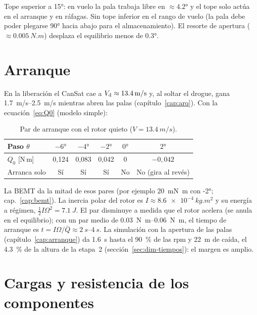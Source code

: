 \begin{resultado}
Tope superior a \ang{+15}: en vuelo la pala trabaja libre en $\approx\ang{4.2}$ y el tope
solo actúa en el arranque y en ráfagas. Sin tope inferior en el rango de vuelo (la pala
debe poder plegarse \ang{90} hacia abajo para el almacenamiento). El resorte de apertura
($\approx\SI{0.005}{N.m}$) desplaza el equilibrio menos de \ang{0.3}.
\end{resultado}

\section{Arranque}\label{sec:arranque}
En la liberación el CanSat cae a $V_{\mathrm{d}}\approx\SI{13.4}{m/s}$ y, al soltar el drogue, gana
\SIrange{1.7}{2.5}{m/s} mientras abren las palas (capítulo~\ref{cap:arq}). Con la
ecuación~\eqref{eq:Q0} (modelo simple):

\begin{table}[H]
\centering\small
\caption{Par de arranque con el rotor quieto ($V=\SI{13.4}{m/s}$).}\label{tab:arranque}
\begin{tabular}{@{}lccccc@{}}
\toprule
Paso $\theta$ & $\ang{-6}$ & $\ang{-4}$ & $\ang{-2}$ & $\ang{0}$ & $\ang{+2}$\\\midrule
$Q_0$ [N\,m] & 0,124 & 0,083 & 0,042 & 0 & $-0{,}042$\\
Arranca solo & Sí & Sí & Sí & No & No (gira al revés)\\
\bottomrule
\end{tabular}
\end{table}

La BEMT da la mitad de esos pares (por ejemplo \SI{20}{mN.m} con \ang{-2}; cap.~\ref{cap:bemt}).
La inercia polar del rotor es $I\approx\SI{8.6e-4}{kg.m^2}$ y su energía a régimen,
$\tfrac12 I\Omega^2=\SI{7.1}{J}$. El par disminuye a medida que el rotor acelera (se anula
en el equilibrio); con un par medio de \SIrange{0.03}{0.06}{N.m}, el tiempo de arranque es
$t=I\Omega/\bar Q\approx\SIrange{2}{4}{s}$. La simulación con la apertura de las palas
(capítulo~\ref{cap:arranque}) da \SI{1.6}{s} hasta el \SI{90}{\percent} de las rpm y
\SI{22}{m} de caída, el \SI{4.3}{\percent} de la altura de la etapa~2 (sección~\ref{sec:dim-tiempos}):
el margen es amplio.

\section{Cargas y resistencia de los componentes}\label{sec:cargas}

